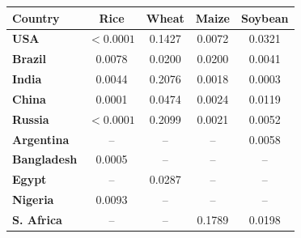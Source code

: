 \begin{tabular}{lcccc}
\toprule
\textbf{Country} & \textbf{Rice} & \textbf{Wheat} & \textbf{Maize} & \textbf{Soybean} \\
\midrule
\textbf{USA} & $<0.0001$ & 0.1427 & 0.0072 & 0.0321 \\
\textbf{Brazil} & 0.0078 & 0.0200 & 0.0200 & 0.0041 \\
\textbf{India} & 0.0044 & 0.2076 & 0.0018 & 0.0003 \\
\textbf{China} & 0.0001 & 0.0474 & 0.0024 & 0.0119 \\
\textbf{Russia} & $<0.0001$ & 0.2099 & 0.0021 & 0.0052 \\
\textbf{Argentina} & -- & -- & -- & 0.0058 \\
\textbf{Bangladesh} & 0.0005 & -- & -- & -- \\
\textbf{Egypt} & -- & 0.0287 & -- & -- \\
\textbf{Nigeria} & 0.0093 & -- & -- & -- \\
\textbf{S. Africa} & -- & -- & 0.1789 & 0.0198 \\
\bottomrule
\end{tabular}
